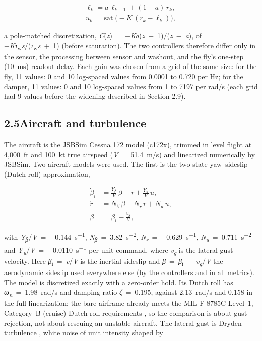 \documentclass[11pt,letterpaper]{article}
\begin{document}
\[\begin{gathered}\ell_k=a\,\ell_{k-1}+(1-a)\,r_k,\\ u_k=\operatorname{sat}\bigl(-K\,(r_k-\ell_k)\bigr),\end{gathered}\tag{6}\]

\noindent a pole-matched discretization,
\emph{C}(\emph{z})~=~−\emph{Ka}(\emph{z}~−~1)/(\emph{z}~−~\emph{a}), of
−\emph{Kτ}\textsubscript{w}\emph{s}/(\emph{τ}\textsubscript{w}\emph{s}~+~1)
(before saturation). The two controllers therefore differ only in the
sensor, the processing between sensor and washout, and the fly's
one-step (10~ms) readout delay. Each gain was chosen from a grid of the
same size: for the fly, 11 values: 0 and 10 log-spaced values from
0.0001 to 0.720 per Hz; for the damper, 11 values: 0 and 10 log-spaced
values from 1 to 7197 per rad/s (each grid had 9 values before the
widening described in Section 2.9).

\subsection{\texorpdfstring{2.5\quad Aircraft and
turbulence}{2.5Aircraft and turbulence}}\label{aircraft-and-turbulence}

\noindent The aircraft is the JSBSim \cite{jsbsim2026} Cessna 172 model
(c172x), trimmed in level flight at 4,000~ft and 100~kt true airspeed
(\emph{V}~=~51.4~m/s) and linearized numerically by JSBSim. Two aircraft
models were used. The first is the two-state yaw--sideslip (Dutch-roll)
approximation,

\[\begin{aligned}\dot\beta_i&=\frac{Y_\beta}{V}\,\beta-r+\frac{Y_u}{V}\,u,\\ \dot r&=N_\beta\,\beta+N_r\,r+N_u\,u,\\ \beta&=\beta_i-\frac{v_g}{V},\end{aligned}\tag{7}\]

\noindent with
\emph{Y\textsubscript{β}}/\emph{V}~=~−0.144~s\textsuperscript{−1},
\emph{N\textsubscript{β}}~=~3.82~s\textsuperscript{−2},
\emph{N\textsubscript{r}}~=~−0.629~s\textsuperscript{−1},
\emph{N\textsubscript{u}}~=~0.711~s\textsuperscript{−2} and
\emph{Y\textsubscript{u}}/\emph{V}~=~−0.0110~s\textsuperscript{−1} per
unit command, where \emph{v\textsubscript{g}} is the lateral gust
velocity. Here \emph{β}\textsubscript{i}~=~\emph{v}/\emph{V} is the
inertial sideslip and
\emph{β}~=~\emph{β}\textsubscript{i}~−~\emph{v\textsubscript{g}}/\emph{V}
the aerodynamic sideslip used everywhere else (by the controllers and in
all metrics). The model is discretized exactly with a zero-order hold.
Its Dutch roll has \emph{ω\textsubscript{n}}~=~1.98~rad/s and damping
ratio \emph{ζ}~=~0.195, against 2.13~rad/s and 0.158 in the full
linearization; the bare airframe already meets the MIL-F-8785C Level~1,
Category~B (cruise) Dutch-roll requirements \cite{milf87851980}, so the
comparison is about gust rejection, not about rescuing an unstable
aircraft. The lateral gust is Dryden turbulence \cite{milf87851980},
white noise of unit intensity shaped by
\end{document}
